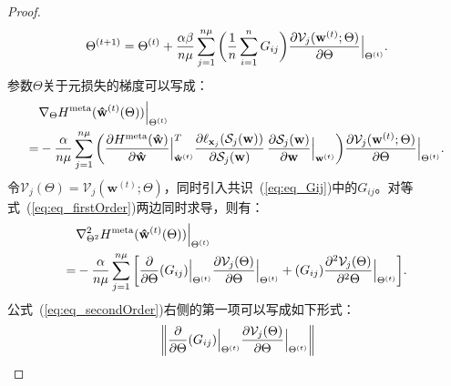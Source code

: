 \begin{proof}
\begin{equation}
    \label{eq:eq_Gij}
    \Theta^{(t+1)} = \Theta^{(t)} + \frac{\alpha\beta}{n\mu}
    \sum\limits_{j=1}^{n\mu}
    \bigg{(}
    \frac{1}{n} \sum\limits_{i=1}^{n} G_{ij}
    \bigg{)}
     \frac{\partial \mathcal{V}_j(\mathbf{w}^{(t)}; \Theta)}{\partial \Theta} \Big{|}_{\Theta^{(t)}}.
\end{equation}
参数$\Theta$关于元损失的梯度可以写成：
\begin{equation}
        \begin{aligned}
        \label{eq:eq_firstOrder}
            & \nabla_{\Theta} H^{\rm meta}(\mathbf{\hat w}^{(t)}(\Theta)) \Big{|}_{\Theta^{(t)}}  \\
            = & -\frac{\alpha}{n\mu} \sum\limits_{j=1}^{n\mu} 
            \bigg{(}
                \frac{\partial H^{\rm meta}(\mathbf{\hat w})}{\partial {\mathbf{\hat  w}}} \Big{|}_{\mathbf{\hat  w}^{(t)}}^T \frac{\partial \ell_{\mathbf{x}_j}(\mathcal{S}_j(\mathbf{w}))}{\partial \mathcal{S}_j(\mathbf{w})} \, \frac{\partial \mathcal{S}_j(\mathbf{w})}{\partial \mathbf{w}} \Big{|}_{\mathbf{w}^{(t)}}
            \bigg{)}
            \frac{\partial \mathcal{V}_j(\mathbf{w}^{(t)}; \Theta)}{\partial \Theta} \Big{|}_{\Theta^{(t)}}.
    \end{aligned}
\end{equation}
令$\mathcal{V}_j(\Theta) = \mathcal{V}_j(\mathbf{w}^{(t)}; \Theta)$，同时引入共识~(\ref{eq:eq_Gij})中的$G_{ij}$。对等式~(\ref{eq:eq_firstOrder})两边同时求导，则有：
\begin{equation}
    \begin{aligned}
        \label{eq:eq_secondOrder}
        & \nabla_{\Theta^2}^2 H^{\rm meta}(\mathbf{\hat w}^{(t)}(\Theta)) \Big{|}_{\Theta^{(t)}}  \\
        = & -\frac{\alpha}{n\mu} \sum\limits_{j=1}^{n\mu}
        \bigg{[}
        \frac{\partial}{\partial \Theta} (G_{ij}) \Big{|}_{\Theta^{(t)}} \frac{\partial \mathcal{V}_j(\Theta)}{\partial \Theta} \Big{|}_{\Theta^{(t)}} 
        +
        (G_{ij}) \frac{\partial^2 \mathcal{V}_j(\Theta)}{\partial ^2 \Theta} \Big{|}_{\Theta^{(t)}}
        \bigg{]}.
    \end{aligned}
\end{equation}
公式~(\ref{eq:eq_secondOrder})右侧的第一项可以写成如下形式：
\begin{equation}
    \begin{aligned}
    \label{eq:app_second_firstTerm}
    & \left\|  
        \frac{\partial}{\partial \Theta} (G_{ij}) \Big{|}_{\Theta^{(t)}} \frac{\partial \mathcal{V}_j(\Theta)}{\partial \Theta} \Big{|}_{\Theta^{(t)}}   \right\|   \\

\end{aligned}
\end{equation}
\end{proof}
